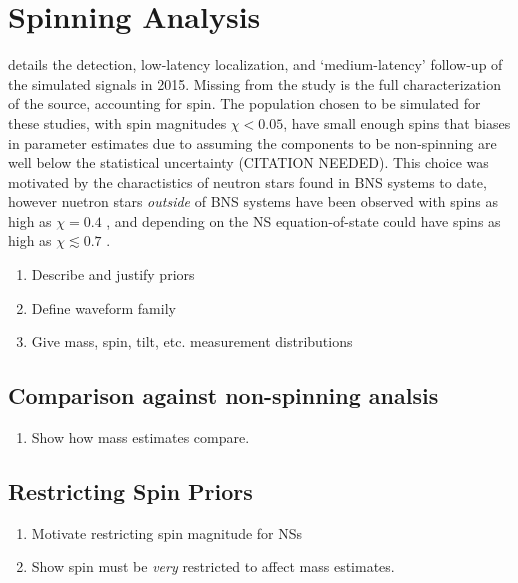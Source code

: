 \section{Spinning Analysis}

\citet{2013arXiv1304.0670L} details the detection, low-latency localization, and `medium-latency' follow-up of the simulated signals in 2015.  Missing from the study is the full characterization of the source, accounting for spin.  The population chosen to be simulated for these studies, with spin magnitudes $\chi < 0.05$, have small enough spins that biases in parameter estimates due to assuming the components to be non-spinning are well below the statistical uncertainty (CITATION NEEDED).  This choice was motivated by the charactistics of neutron stars found in BNS systems to date, however nuetron stars \emph{outside} of BNS systems have been observed with spins as high as $\chi = 0.4$ \cite{Hessels_2006,Brown_2012}, and depending on the NS equation-of-state could have spins as high as $\chi \lesssim 0.7$ \cite{Lo_2011}.


\begin{enumerate}
\item Describe and justify priors
\item Define waveform family
\item Give mass, spin, tilt, etc. measurement distributions
\end{enumerate}


\subsection{Comparison against non-spinning analsis}

\begin{enumerate}
\item Show how mass estimates compare.
\end{enumerate}


\subsection{Restricting Spin Priors}

\begin{enumerate}
\item Motivate restricting spin magnitude for NSs
\item Show spin must be \textit{very} restricted to affect mass estimates.
\end{enumerate}